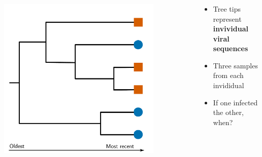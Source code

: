 \documentclass[aspectratio=169]{beamer}
\begin{document}
\begin{frame} \frametitle{\insertsection}

    \begin{columns}

        \begin{column}{0.6\textwidth}
            
            \begin{center}
                \centering\includegraphics[width=0.8\textwidth]{images/tree-blank}
            \end{center}

        \end{column}

        \begin{column}{0.5\textwidth}

            \begin{itemize}
                \item{Tree tips represent \textbf{invividual viral sequences}}
                \item{Three samples from each invididual}
                \item{If one infected the other, when?}
            \end{itemize}

        \end{column}

    \end{columns}

\end{frame}
\end{document}
